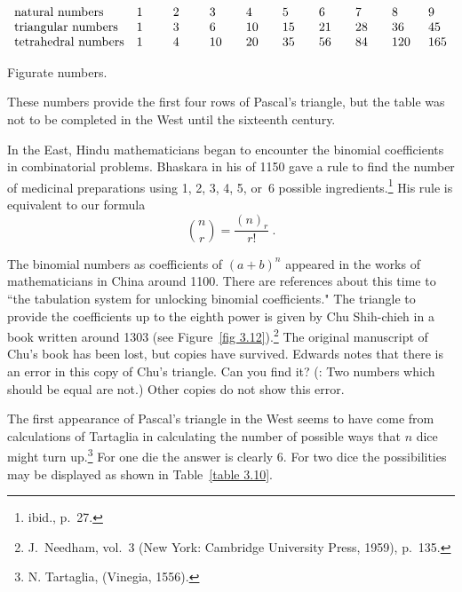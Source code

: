 


\begin{table}
\centering
$$
\begin{array}{llllllllll} 
 \mbox {natural\ numbers}    & 1\hskip.2in & 2\hskip.2in & 3\hskip.2in & 4\hskip.2in & 5\hskip.2in & 6\hskip.2in & 7\hskip.2in & 8\hskip.2in & 9  \cr
 \mbox {triangular\ numbers} & 1     & 3     & 6    & 10   & 15   & 21   & 28   & 36  & 45 \cr
 \mbox {tetrahedral\ numbers}& 1     & 4     & 10   & 20   & 35   & 56   & 84   & 120 &165  
\end{array}
$$
\caption{Figurate numbers.}
\label{table 3.9}
\end{table}
\par These numbers provide the first four rows of Pascal's triangle, but the table was
not to be completed in the West until the sixteenth century.
\par
In the East, Hindu mathematicians began to encounter the binomial coefficients in
combinatorial problems.  Bhaskara in his  of 1150 gave a rule to find
the number of medicinal preparations using 1, 2, 3, 4, 5, or~6 possible
ingredients.\footnote{ibid., p.~27.}  His rule is equivalent to our formula
$$ {n \choose r} = \frac{(n)_r}{r!}\ .
$$
\par
The binomial numbers as coefficients of $(a + b)^n$ appeared in the works of
mathematicians in China around 1100.  There are references about this time to ``the
tabulation system for unlocking binomial coefficients."  The triangle to provide the
coefficients up to the eighth power is given by Chu Shih-chieh in a book
written around 1303 (see Figure~\ref{fig 3.12}).\footnote{J.\ Needham,  vol.~3 (New York: Cambridge University Press, 1959), p.~135.} 
The original manuscript of Chu's book has been lost, but copies have survived.
Edwards notes that there is an error in this copy of Chu's triangle.  Can you find
it?  (: Two numbers which should be equal are not.)  Other copies do not
show this error.
\par
The first appearance of Pascal's triangle in the West seems to have come from
calculations of Tartaglia in calculating the number of possible ways that $n$ dice
might turn up.\footnote{N. Tartaglia,  (Vinegia, 1556).}  For one die the answer is clearly 6.  For two dice the
possibilities may be displayed as shown in Table~\ref{table 3.10}.

